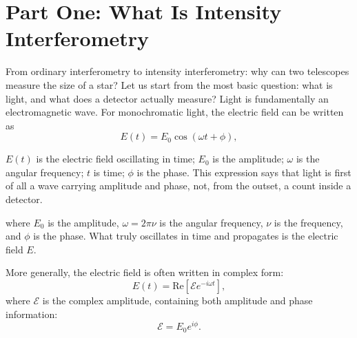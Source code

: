 \chapter*{Part One: What Is Intensity Interferometry}
{}
\label{quickstart:intensity-interferometry}

From ordinary interferometry to intensity interferometry: why can two telescopes measure the size of a star? Let us start from the most basic question: what is light, and what does a detector actually measure? Light is fundamentally an electromagnetic wave. For monochromatic light, the electric field can be written as
\[
  E(t)=E_0\cos(\omega t+\phi),
\]
\begin{formulaexplain}
\(E(t)\) is the electric field oscillating in time; \(E_0\) is the amplitude; \(\omega\) is the angular frequency; \(t\) is time; \(\phi\) is the phase. This expression says that light is first of all a wave carrying amplitude and phase, not, from the outset, a count inside a detector.
\end{formulaexplain}
where \(E_0\) is the amplitude, \(\omega=2\pi\nu\) is the angular frequency, \(\nu\) is the frequency, and \(\phi\) is the phase. What truly oscillates in time and propagates is the electric field \(E\).

More generally, the electric field is often written in complex form:
\[
  E(t)=\mathrm{Re}\left[\mathcal E e^{-i\omega t}\right],
\]
where \(\mathcal E\) is the complex amplitude, containing both amplitude and phase information:
\[
  \mathcal E=E_0 e^{i\phi}.
\]

